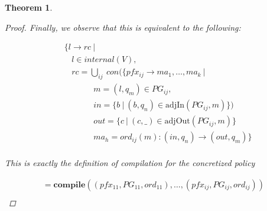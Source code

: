 \documentclass[twocolumn, openany]{sig-alternate-10pt}
\newtheorem{thm}{Theorem}
\begin{document}
\begin{thm}
\begin{proof}
  Finally, we observe that this is equivalent to the following:

  \[ \begin{array}{l}
     ~~~~~ \{ l \rightarrow rc ~\vert~ \\
     ~~~~~~~~~ l \in internal(V), \\
     ~~~~~~~~~ rc = \bigcup_{ij}~ con(\{ pfx_{ij} \rightarrow ma_1, \dots, ma_k ~\vert~ \\
     ~~~~~~~~~~~~~~~~~~~~~ m = (l,q_m) \in PG_{ij}, \\
     ~~~~~~~~~~~~~~~~~~~~~ in = \{ b ~\vert~ (b,q_n) \in \text{adjIn}(PG_{ij},m) \}) \\
     ~~~~~~~~~~~~~~~~~~~~~ out = \{ c ~\vert~ (c,\_) \in \text{adjOut}(PG_{ij},m) \} \\
     ~~~~~~~~~~~~~~~~~~~~~ ma_h = ord_{ij}(m) : (in,q_n) \rightarrow (out,q_m) \} \\
  \end{array} \]%

  This is exactly the definition of compilation for the concretized policy

  \[ \begin{array}{l}
     = \textbf{compile}( (pfx_{11},PG_{11},ord_{11}), \dots, (pfx_{ij},PG_{ij},ord_{ij}) ) \\
  \end{array} \]%


  \end{proof}

\end{thm}
\end{document}
